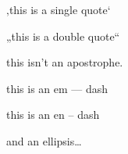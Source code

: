 
\def\mytitle{MultiMarkdown German Test}


‚this is a single quote`

„this is a double quote``

this isn't an apostrophe.

this is an em --- dash

this is an en -- dash

and an ellipsis{\ldots}




